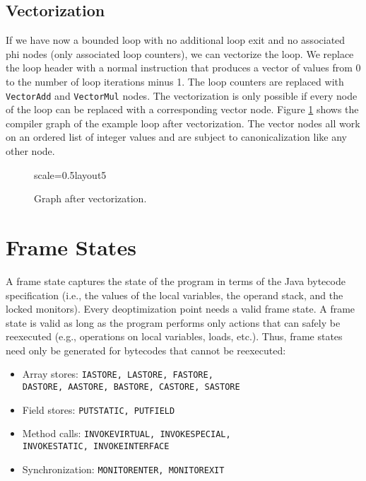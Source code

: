\documentclass[twocolumn]{svjour3}
\begin{document}
\subsection{Vectorization}

If we have now a bounded loop with no additional loop exit and no associated phi nodes (only associated loop counters), we can vectorize the loop.
We replace the loop header with a normal instruction that produces a vector of values from 0 to the number of loop iterations minus 1.
The loop counters are replaced with \texttt{VectorAdd} and \texttt{VectorMul} nodes.
The vectorization is only possible if every node of the loop can be replaced with a corresponding vector node.
Figure \ref{fig:loop5} shows the compiler graph of the example loop after vectorization.
The vector nodes all work on an ordered list of integer values and are subject to canonicalization like any other node.


\begin{figure}[h]
  \label{fig:loop5}
  \centering
\begin{digraphenv}{scale=0.5}{layout5}
\end{digraphenv}
  \caption{Graph after vectorization.}
\end{figure}


\section{Frame States}
A frame state captures the state of the program in terms of the Java bytecode specification (i.e., the values of the local variables, the operand stack, and the locked monitors).
Every deoptimization point needs a valid frame state.
A frame state is valid as long as the program performs only actions that can safely be reexecuted (e.g., operations on local variables, loads, etc.).
Thus, frame states need only be generated for bytecodes that cannot be reexecuted:

\begin{itemize}
    \item Array stores: {\tt IASTORE, LASTORE, FASTORE, \\DASTORE, AASTORE, BASTORE, CASTORE, SASTORE}
    \item Field stores: {\tt PUTSTATIC, PUTFIELD}
    \item Method calls: {\tt INVOKEVIRTUAL, INVOKESPECIAL, \\INVOKESTATIC, INVOKEINTERFACE}
    \item Synchronization: {\tt MONITORENTER, MONITOREXIT}
\end{itemize}
\end{document}
